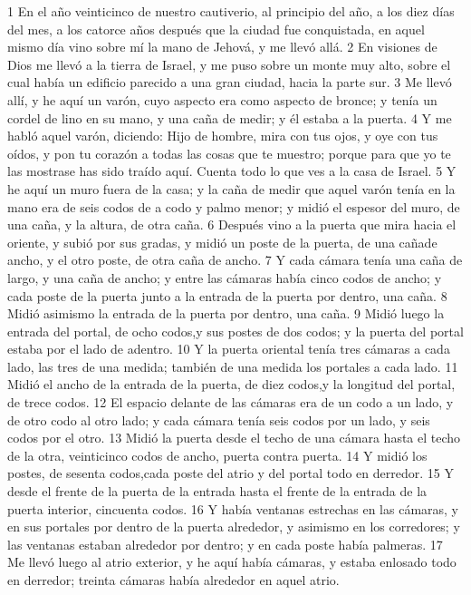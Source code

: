 1 En el año veinticinco de nuestro cautiverio, al principio del año, a los diez días del mes, a los catorce años después que la ciudad fue conquistada, en aquel mismo día vino sobre mí la mano de Jehová, y me llevó allá.
2 En visiones de Dios me llevó a la tierra de Israel, y me puso sobre un monte muy alto, sobre el cual había un edificio parecido a una gran ciudad, hacia la parte sur. 
3 Me llevó allí, y he aquí un varón, cuyo aspecto era como aspecto de bronce; y tenía un cordel de lino en su mano, y una caña de medir; y él estaba a la puerta.
4 Y me habló aquel varón, diciendo: Hijo de hombre, mira con tus ojos, y oye con tus oídos, y pon tu corazón a todas las cosas que te muestro; porque para que yo te las mostrase has sido traído aquí. Cuenta todo lo que ves a la casa de Israel.
5 Y he aquí un muro fuera de la casa; y la caña de medir que aquel varón tenía en la mano era de seis codos de a codo y palmo menor; y midió el espesor del muro, de una caña, y la altura, de otra caña.
6 Después vino a la puerta que mira hacia el oriente, y subió por sus gradas, y midió un poste de la puerta, de una cañade ancho, y el otro poste, de otra caña de ancho.
7 Y cada cámara tenía una caña de largo, y una caña de ancho; y entre las cámaras había cinco codos de ancho; y cada poste de la puerta junto a la entrada de la puerta por dentro, una caña.
8 Midió asimismo la entrada de la puerta por dentro, una caña.
9 Midió luego la entrada del portal, de ocho codos,y sus postes de dos codos; y la puerta del portal estaba por el lado de adentro.
10 Y la puerta oriental tenía tres cámaras a cada lado, las tres de una medida; también de una medida los portales a cada lado.
11 Midió el ancho de la entrada de la puerta, de diez codos,y la longitud del portal, de trece codos.
12 El espacio delante de las cámaras era de un codo a un lado, y de otro codo al otro lado; y cada cámara tenía seis codos por un lado, y seis codos por el otro.
13 Midió la puerta desde el techo de una cámara hasta el techo de la otra, veinticinco codos de ancho, puerta contra puerta.
14 Y midió los postes, de sesenta codos,cada poste del atrio y del portal todo en derredor.
15 Y desde el frente de la puerta de la entrada hasta el frente de la entrada de la puerta interior, cincuenta codos.
16 Y había ventanas estrechas en las cámaras, y en sus portales por dentro de la puerta alrededor, y asimismo en los corredores; y las ventanas estaban alrededor por dentro; y en cada poste había palmeras.
17 Me llevó luego al atrio exterior, y he aquí había cámaras, y estaba enlosado todo en derredor; treinta cámaras había alrededor en aquel atrio.

